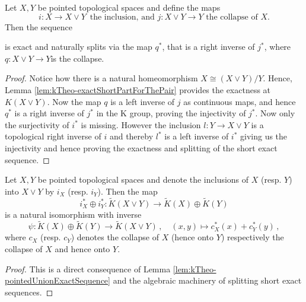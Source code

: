 \begin{lemma}\label{lem:kTheo-pointedUnionExactSequence}
	Let $X,Y$ be pointed topological spaces and define the maps
	\begin{equation*}
		i:X\to X\vee Y\,\text{ the inclusion, and }j:X\vee Y\to Y \text{ the collapse of $X$.}
	\end{equation*} Then the sequence
	\begin{center}
	\end{center} is exact and naturally splits via the map $q^*$, that is a right inverse of $j^*$, where 
	$
		q:X\vee Y \to Y 
	$is the collapse.
\end{lemma}
\begin{proof}
	Notice how there is a natural homeomorphism $X\cong (X\vee Y)\big/ Y$.  Hence, Lemma \ref{lem:kTheo-exactShortPartForThePair} provides the exactness at $K(X\vee Y)$. Now the map $q$ is a left inverse of $j$ as continuous maps, and hence $q^*$ is a right inverse of $j^*$ in the K group, proving the injectivity of $j^*$. Now only the surjectivity of $i^*$ is missing. However the inclusion $l:Y\to X\vee Y$ is a topological right inverse of $i$ and thereby $l^*$ is a left inverse of $i^*$ giving us the injectivity and hence proving the exactness and splitting of the short exact sequence.
\end{proof}
\begin{theorem} \label{thm:kTheo-pointedAdditivity}
	Let $X,Y$ be pointed topological spaces and denote the inclusions of $X$ (resp. $Y$) into $X\vee Y$ by $i_X$ (resp. $i_Y$). Then the map 
	\begin{equation*}
		i_X^*\oplus  i_Y^*:\tilde{K}(X\vee Y)\to \tilde{K}(X)\oplus \tilde{K}(Y)
	\end{equation*} is a natural isomorphism with inverse 
	\begin{equation*}
		\psi: \tilde{K}(X)\oplus \tilde{K}(Y) \to \tilde{K}(X\vee Y)\,,\quad (x,y)\mapsto c_X^*(x)+c_Y^*(y)\,,
	\end{equation*}where $c_X$ (resp. $c_Y$) denotes the collapse of $X$ (hence onto $Y$) respectively the collapse of $X$ and hence onto $Y$.
\end{theorem}
\begin{proof}
	This is a direct consequence of Lemma \ref{lem:kTheo-pointedUnionExactSequence} and the algebraic machinery of splitting short exact sequences.
\end{proof}

